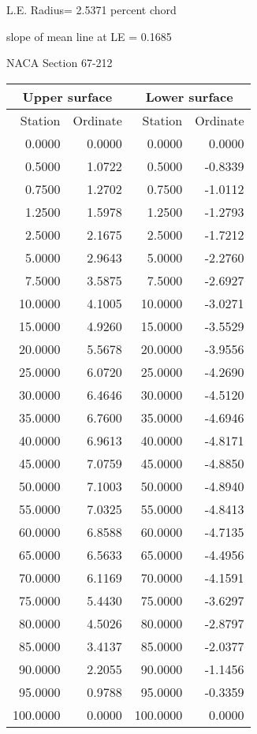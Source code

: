 \documentclass[11pt]{book}
\begin{document}
L.E. Radius=  2.5371 percent chord


 slope of mean line at LE =  0.1685
 \newpage
  \label{s67-212}
 \begin{Large}
 NACA Section 67-212
 \end{Large}
  
 \vspace{8mm}
 \begin{tabular}{|r|r|r|r|} \hline 
 \multicolumn{2}{|c|}{Upper surface} & \multicolumn{2}{|c|}{Lower surface} \\
 \hline
 Station & Ordinate & Station & Ordinate \\
 \hline
0.0000 & 0.0000 & 0.0000 & 0.0000 \\
0.5000 & 1.0722 & 0.5000 & -0.8339 \\
0.7500 & 1.2702 & 0.7500 & -1.0112 \\
1.2500 & 1.5978 & 1.2500 & -1.2793 \\
2.5000 & 2.1675 & 2.5000 & -1.7212 \\
5.0000 & 2.9643 & 5.0000 & -2.2760 \\
7.5000 & 3.5875 & 7.5000 & -2.6927 \\
10.0000 & 4.1005 & 10.0000 & -3.0271 \\
15.0000 & 4.9260 & 15.0000 & -3.5529 \\
20.0000 & 5.5678 & 20.0000 & -3.9556 \\
25.0000 & 6.0720 & 25.0000 & -4.2690 \\
30.0000 & 6.4646 & 30.0000 & -4.5120 \\
35.0000 & 6.7600 & 35.0000 & -4.6946 \\
40.0000 & 6.9613 & 40.0000 & -4.8171 \\
45.0000 & 7.0759 & 45.0000 & -4.8850 \\
50.0000 & 7.1003 & 50.0000 & -4.8940 \\
55.0000 & 7.0325 & 55.0000 & -4.8413 \\
60.0000 & 6.8588 & 60.0000 & -4.7135 \\
65.0000 & 6.5633 & 65.0000 & -4.4956 \\
70.0000 & 6.1169 & 70.0000 & -4.1591 \\
75.0000 & 5.4430 & 75.0000 & -3.6297 \\
80.0000 & 4.5026 & 80.0000 & -2.8797 \\
85.0000 & 3.4137 & 85.0000 & -2.0377 \\
90.0000 & 2.2055 & 90.0000 & -1.1456 \\
95.0000 & 0.9788 & 95.0000 & -0.3359 \\
100.0000 & 0.0000 & 100.0000 & 0.0000 \\
 \hline 
 \end{tabular}
\end{document}
